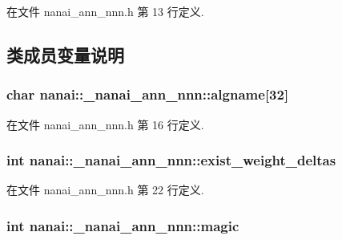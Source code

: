 在文件 nanai\+\_\+ann\+\_\+nnn.\+h 第 13 行定义.



\subsection{类成员变量说明}
\hypertarget{structnanai_1_1__nanai__ann__nnn_a2d2b2bebff29680023fb37c6ba5ff657}{}
\subsubsection[{algname}]{\setlength{\rightskip}{0pt plus 5cm}char nanai\+::\+\_\+nanai\+\_\+ann\+\_\+nnn\+::algname\mbox{[}32\mbox{]}}\label{structnanai_1_1__nanai__ann__nnn_a2d2b2bebff29680023fb37c6ba5ff657}


在文件 nanai\+\_\+ann\+\_\+nnn.\+h 第 16 行定义.

\hypertarget{structnanai_1_1__nanai__ann__nnn_a8ce4ec15d75481ca2c5e99f297fddd01}{}
\subsubsection[{exist\+\_\+weight\+\_\+deltas}]{\setlength{\rightskip}{0pt plus 5cm}int nanai\+::\+\_\+nanai\+\_\+ann\+\_\+nnn\+::exist\+\_\+weight\+\_\+deltas}\label{structnanai_1_1__nanai__ann__nnn_a8ce4ec15d75481ca2c5e99f297fddd01}


在文件 nanai\+\_\+ann\+\_\+nnn.\+h 第 22 行定义.

\hypertarget{structnanai_1_1__nanai__ann__nnn_a7933ac2b57f4f25860baeea2e817cb07}{}
\subsubsection[{magic}]{\setlength{\rightskip}{0pt plus 5cm}int nanai\+::\+\_\+nanai\+\_\+ann\+\_\+nnn\+::magic}\label{structnanai_1_1__nanai__ann__nnn_a7933ac2b57f4f25860baeea2e817cb07}


